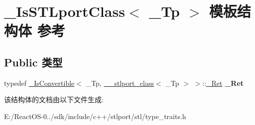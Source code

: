 \hypertarget{struct___is_s_t_lport_class}{}\section{\+\_\+\+Is\+S\+T\+Lport\+Class$<$ \+\_\+\+Tp $>$ 模板结构体 参考}
\label{struct___is_s_t_lport_class}
\subsection*{Public 类型}
\begin{DoxyCompactItemize}
\item 
\mbox{\label{struct___is_s_t_lport_class_a702084178a863a8c2468f0e0cbaaeef6}} 
typedef \hyperlink{struct___is_convertible}{\+\_\+\+Is\+Convertible}$<$ \+\_\+\+Tp, \hyperlink{struct____stlport__class}{\+\_\+\+\_\+stlport\+\_\+class}$<$ \+\_\+\+Tp $>$ $>$\+::\hyperlink{struct____true__type}{\+\_\+\+Ret} {\bfseries \+\_\+\+Ret}
\end{DoxyCompactItemize}


该结构体的文档由以下文件生成\+:\begin{DoxyCompactItemize}
\item 
E\+:/\+React\+O\+S-\/0../sdk/include/c++/stlport/stl/type\+\_\+traits.\+h\end{DoxyCompactItemize}
